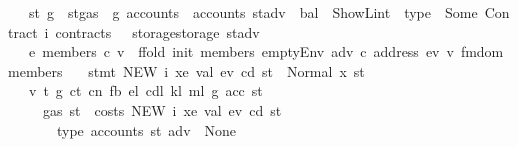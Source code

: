 \begin{isabellebody}
\ \ \ {\isachardoublequoteopen}st{}\ g\ {\isasymequiv}\ st{\isasymlparr}gas\ {\isacharcolon}{\kern0pt}{\isacharequal}{\kern0pt}\ g{\isacharcomma}{\kern0pt}\ accounts\ {\isacharcolon}{\kern0pt}{\isacharequal}{\kern0pt}\ {\isacharparenleft}{\kern0pt}accounts\ st{\isacharparenright}{\kern0pt}{\isacharparenleft}{\kern0pt}adv{}\ {\isacharcolon}{\kern0pt}{\isacharequal}{\kern0pt}\ {\isasymlparr}bal\ {\isacharequal}{\kern0pt}\ ShowL\isactrlsub i\isactrlsub n\isactrlsub t\ {}{\isacharcomma}{\kern0pt}\ type\ {\isacharequal}{\kern0pt}\ Some\ {\isacharparenleft}{\kern0pt}Contract\ i{\isacharparenright}{\kern0pt}{\isacharcomma}{\kern0pt}\ contracts\ {\isacharequal}{\kern0pt}\ {}{\isasymrparr}{\isacharparenright}{\kern0pt}{\isacharcomma}{\kern0pt}\ storage{\isacharcolon}{\kern0pt}{\isacharequal}{\kern0pt}{\isacharparenleft}{\kern0pt}storage\ st{\isacharparenright}{\kern0pt}{\isacharparenleft}{\kern0pt}adv{}\ {\isacharcolon}{\kern0pt}{\isacharequal}{\kern0pt}\ {\isacharbraceleft}{\kern0pt}{\isachardollar}{\kern0pt}{\isachardollar}{\kern0pt}{\isacharbraceright}{\kern0pt}{\isacharparenright}{\kern0pt}{\isasymrparr}{\isachardoublequoteclose}\isanewline
\ \ \ {\isachardoublequoteopen}e{\isacharprime}{\kern0pt}\ members\ c\ v\ {\isasymequiv}\ ffold\ {\isacharparenleft}{\kern0pt}init\ members{\isacharparenright}{\kern0pt}\ {\isacharparenleft}{\kern0pt}emptyEnv\ adv{}\ c\ {\isacharparenleft}{\kern0pt}address\ ev{\isacharparenright}{\kern0pt}\ v{\isacharparenright}{\kern0pt}\ {\isacharparenleft}{\kern0pt}fmdom\ members{\isacharparenright}{\kern0pt}{\isachardoublequoteclose}\isanewline
\ \ \ {\isachardoublequoteopen}stmt\ {\isacharparenleft}{\kern0pt}NEW\ i\ xe\ val{\isacharparenright}{\kern0pt}\ ev\ cd\ st\ {\isacharequal}{\kern0pt}\ Normal\ {\isacharparenleft}{\kern0pt}x{\isacharcomma}{\kern0pt}\ st{\isacharprime}{\kern0pt}{\isacharparenright}{\kern0pt}{\isachardoublequoteclose}\isanewline
\ \ \ v\ t\ g\ ct\ cn\ fb\ e\isactrlsub l\ cd\isactrlsub l\ k\isactrlsub l\ m\isactrlsub l\ g{\isacharprime}{\kern0pt}\ acc\ st{\isacharprime}{\kern0pt}{\isacharprime}{\kern0pt}\isanewline
\ \ \ \ \ {\isachardoublequoteopen}gas\ st\ {\isachargreater}{\kern0pt}\ costs\ {\isacharparenleft}{\kern0pt}NEW\ i\ xe\ val{\isacharparenright}{\kern0pt}\ ev\ cd\ st{\isachardoublequoteclose}\isanewline
\ \ \ \ \ \ \ {\isachardoublequoteopen}type\ {\isacharparenleft}{\kern0pt}accounts\ st\ adv{}{\isacharparenright}{\kern0pt}\ {\isacharequal}{\kern0pt}\ None{\isachardoublequoteclose}\isanewline

\end{isabellebody}
